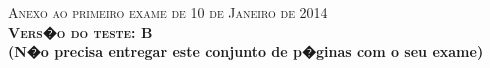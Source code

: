 \documentclass{docist}
\begin{document}
\thispagestyle{empty}

\begin{center}
  {\Large \textsc{Anexo ao primeiro exame de 10 de Janeiro de 2014\\[2ex]
      \textbf{Vers�o do teste: B}\\[2ex]}}
  {\normalsize  \textbf{(N�o precisa entregar este conjunto de p�ginas com o seu exame)}}
\end{center}



\qInstallImplementationStyles

\qFenixTwo

\qMWQualities

\qMWArchitecuralStyle

\qMWReliabilityTactics

\qMWReliabilityReadsImplementation

\qMWResourceLoaderTactic

\qUnitOfWork

\qAvailabilityVoting

\qCHSecurityQuality

\qCHPerformanceQuality

\qCHMobilityArchitecturalStyle

\qCHAmazonSilkTwo

\qCHSecurityLevel

\qCHOmniboxTactics

\qSecurityInternalSource

\qDataModel

\qGPReceiverWriterStyle

\qGPCarbonRelay

\qGPComposerUIQuality

\qUsabilityNonArchitectural

\qWorldWide

\qGMPicklePerformance

\qGMRestModularity

\qGMPipesFiltersData

\qGMReliabilityFIFO

\qGMMasterRunner

\qGMMessagesPersistence

\qPublishSubscribe

\qElasticityDeferBinding
\end{document}
